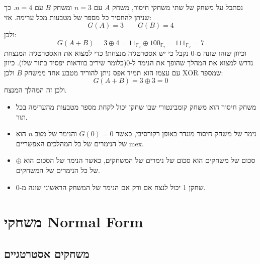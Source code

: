 \documentclass{tstextbook}
\begin{document}
\begin{example}
נסתכל על משחק של שתי משחקי חיסור, משחק \(A\) עם \(n=3\) ומשחק \(B\) עם \(n=4\). כך שניתן להחסיר כל מספר של מטבעות מכל ערימה. אזי:
$$G(A)=3\qquad  G(B)=4$$
ולכן:
$$G(A+B)=3\oplus 4= 11_{\mathbb{F}  _{2}}\oplus 100_{\mathbb{F}_{2} }=111_{\mathbb{F_{2}} }=7$$
וכיוון שזהו שונה מ-0 נקבל כי יש אסטרטגיה מנצחת! כדי למצוא את האסטרטגיה המנצחת נדרש למצוא את המהלך שהופך את הנימר ל-0(כלומר שיריב בוודאות יפסיד בתור שלו). כיוון שמספר \(\text{XOR}\) עם עצמו הוא תמיד אפס ניתן להוריד מטבע אחד ממשחק \(B\) ולכן:
$$G(A+B)=3\oplus 3 = 0$$
ולכן זה המהלך המנצח.

\end{example}
\begin{summary}
  \begin{itemize}
    \item משחק חיסור הוא משחק קומבינטורי שבו שחקן יכול לקחת מספר מטבעות מהערימה בכל תור.
    \item נימר של משחק חיסור מוגדר באופן רקורסיבי, כאשר \(G(0)=0\) והנימר של מצב \(n\) הוא \(\mathrm{mex}\) של הנימרים של כל המהלכים האפשריים.
    \item סכום של משחקים הוא סכום של נימרים של המשחקים, כאשר הנימר של הסכום הוא \(\oplus\) של כל הנימרים של המשחקים.
    \item שחקן 1 יכול לנצח אם ורק אם הנימר של המשחק הראשוני שונה מ-0.
  \end{itemize}
\end{summary}
\chapter{משחקי Normal Form}

\section{משחקים אסטרטגיים}
\end{document}
